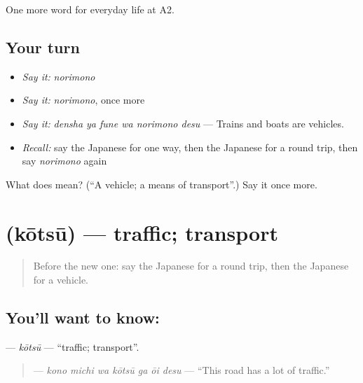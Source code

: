 \begin{grammarlens}[title={What you've built}]
One more word for everyday life at A2.
\end{grammarlens}

\subsection*{Your turn}
\begin{itemize}
\raggedright
  \item \emph{Say it:} \emph{norimono}
  \item \emph{Say it:} \emph{norimono}, once more
  \item \emph{Say it:} \emph{densha ya fune wa norimono desu} — Trains and boats are vehicles.
  \item \emph{Recall:} say the Japanese for one way, then the Japanese for a round trip, then say \emph{norimono} again
\end{itemize}

\begin{tcolorbox}[breakable,colback=teal!4,colframe=teal!35!black,title={Before you move on}]
What does  mean? (\textquotedblleft{}A vehicle; a means of transport\textquotedblright{}.) Say it once more.
\end{tcolorbox}
\section[\texorpdfstring{\ja{こうつう} (kōtsū)}{こうつう (kōtsū)}]{ (kōtsū) — traffic; transport}

\label{lesson:JA-C206-koutsuu}



\begin{quote}
Before the new one: say the Japanese for a round trip, then the Japanese for a vehicle.
\end{quote}

\subsection*{You'll want to know: }
\textbf{} — \emph{kōtsū} — \textquotedblleft{}traffic; transport\textquotedblright{}.

\begin{quote}
\textbf{   } — \emph{kono michi wa kōtsū ga ōi desu} — \textquotedblleft{}This road has a lot of traffic.\textquotedblright{}
\end{quote}

